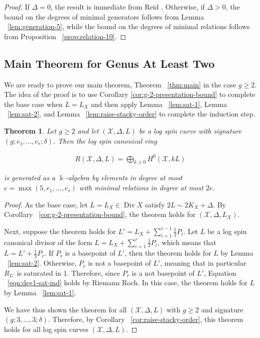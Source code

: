 \documentclass{amsart}
\theoremstyle{plain}
\newtheorem{thm}{Theorem}[section]
\theoremstyle{definition}
\theoremstyle{remark}
\numberwithin{equation}{section}
\newcommand\ssec{\subsection}
\newcommand\Bk{{\Bbbk}}
\DeclareMathOperator\di{Div}
\newcommand\sx{\mathscr X}
\newcommand{\halfcan}{L}
\begin{document}
\begin{proof}
If $\Delta = 0$, the result is immediate from Reid \cite[Theorem 3.4]
{reid:infinitesimal}. Otherwise, if $\Delta > 0$, the bound on the
degrees of minimal generators follows from Lemma
~\ref{lem:generation-5}, while the bound on the degrees of minimal
relations follows from Proposition ~\ref{prop:relation-10}.
\end{proof}

\ssec{Main Theorem for Genus At Least Two}
\label{ssec:g-high-main}

We are ready to prove our main theorem, Theorem ~\ref{thm:main} in the case
$g \geq 2$. The idea of the proof is to use Corollary \ref{cor:g-2-presentation-bound} to 
complete the base case when $L = \halfcan_X$ and then apply Lemma
~\ref{lem:sat-1}, Lemma ~\ref{lem:sat-2}, and Lemma
~\ref{lem:raise-stacky-order} to complete the induction step.

\begin{thm}
\label{thm:g-high-main}
Let $g \geq 2$ and let $(\sx, \Delta, \halfcan)$ be a log spin curve 
with signature $(g; e_1, \ldots, e_r; \delta)$. Then the
log spin canonical ring

\begin{align*}
	R(\sx, \Delta, \halfcan) = \bigoplus_{k \geq 0} H^0(\sx, k L )
\end{align*}

\noindent
is generated as a $\Bk$-algebra by elements in degree at most $e =
\max(5, e_1, \ldots, e_r)$ with minimal relations in degree at most $2e$.
\end{thm}

%

\begin{proof}
As the base case, let $\halfcan = \halfcan_X \in \di X$ satisfy $2 \halfcan \sim 2 K_X + \Delta$.
By Corollary ~\ref{cor:g-2-presentation-bound}, the theorem holds for $(\sx, \Delta,
\halfcan_X)$. 

Next, suppose the theorem holds for $\halfcan' = \halfcan_X + \sum_{i=1}^{r-1} \frac{1}{3}P_i$. Let $\halfcan$ be a log spin canonical divisor of the form $\halfcan = \halfcan_X + \sum_{i = 1}^r \frac{1}{3} P_i$, which means that $\halfcan = \halfcan' + \frac{1}{3} P_r$.  If $P_r$ is a basepoint of $\halfcan'$, then the theorem holds for $\halfcan$ by Lemma ~\ref{lem:sat-2}.
Otherwise, $P_r$ is not a basepoint of $\halfcan'$, meaning that in particular $R_{\halfcan'}$ is saturated in 1.
Therefore, since $P_r$ is a not basepoint of $\halfcan'$, Equation
~\ref{eqn:deg1-sat-ind} holds by Riemann Roch.
In this case, the theorem holds for $\halfcan$ by Lemma ~\ref{lem:sat-1}.

We have thus shown the theorem for all $(\sx, \Delta, \halfcan)$ with $g \ge 2$ and signature $(g; 3, \ldots, 3; \delta)$. Therefore, by Corollary 
~\ref{cor:raise-stacky-order}, this theorem 
holds for all log spin curves $(\sx, \Delta, \halfcan)$. 
\end{proof}
\end{document}
